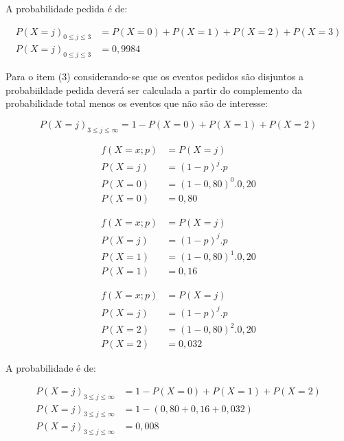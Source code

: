 \documentclass[
]{book}
\begin{document}
\hfill\break

A probabilidade pedida é de:

\begin{align*}
P(X=j)_{0 \le j \le 3} & = P(X=0) + P(X=1) + P(X=2) + P(X=3) \\
P(X=j)_{0 \le j \le 3} & =  0,9984
\end{align*}

\hfill\break

Para o item (3) considerando-se que os eventos pedidos são disjuntos a probabiildade pedida deverá ser calculada a partir do complemento da probabilidade total menos os eventos que não são de interesse:

\hfill\break

\[
P(X=j)_{3 \le j \le \infty} = 1 - P(X=0) + P(X=1) + P(X=2)
\]

\hfill\break

\begin{align*}
f(X=x; p) & =  P(X=j) \\
P(X=j) & = (1-p)^{j} . p \\
P(X=0) & = (1-0,80)^{0} . 0,20 \\
P(X=0) & =  0,80 
\end{align*}

\hfill\break

\begin{align*}
f(X=x; p) & =  P(X=j) \\
P(X=j) & =  (1-p)^{j} . p \\
P(X=1) & =  (1-0,80)^{1} . 0,20 \\
P(X=1) & =  0,16
\end{align*}

\hfill\break

\begin{align*}
f(X=x; p) & =   P(X=j) \\
P(X=j) & =  (1-p)^{j} . p \\
P(X=2) & =  (1-0,80)^{2} . 0,20 \\
P(X=2) & =  0,032
\end{align*}

\hfill\break

A probabilidade é de:

\begin{align*}
P(X=j)_{3 \le j \le \infty} &  =  1 - P(X=0) + P(X=1) + P(X=2) \\
P(X=j)_{3 \le j \le \infty} &  = 1 - (0,80 + 0,16 + 0,032) \\
P(X=j)_{3 \le j \le \infty} &  = 0,008
\end{align*}
\end{document}

